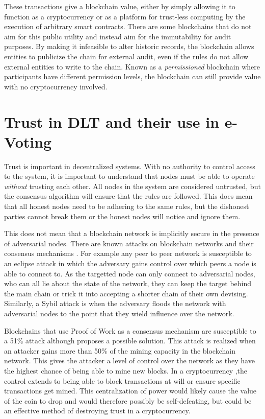 These transactions give a blockchain value, either by simply allowing it to function as a cryptocurrency or as a platform for trust-less computing by the execution of arbitrary smart contracts. There are some blockchains that do not aim for this public utility and instead aim for the immutability for audit purposes. By making it infeasible to alter historic records, the blockchain allows entities to publicize the chain for external audit, even if the rules do not allow external entities to write to the chain. Known as a \emph{permissioned} blockchain where participants have different permission levels, the blockchain can still provide value with no cryptocurrency involved.

\section{Trust in DLT and their use in e-Voting}
\label{ch:blockchain:trust}

Trust is important in decentralized systems. With no authority to control access to the system, it is important to understand that nodes must be able to operate \emph{without} trusting each other. All nodes in the system are considered untrusted, but the consensus algorithm will ensure that the rules are followed. This does mean that all honest nodes need to be adhering to the same rules, but the dishonest parties cannot break them or the honest nodes will notice and ignore them.

This does not mean that a blockchain network is implicitly secure in the presence of adversarial nodes. There are known attacks on blockchain networks and their consensus mechanisms \cite{wenAttacksCountermeasuresBlockchains2021a,eyalMajorityNotEnough2014,sapirshteinOptimalSelfishMining2017,karameDoublespendingFastPayments2012,apostolakiHijackingBitcoinRouting2017,gaziStakeBleedingAttacksProofofStake2018}. For example any peer to peer network is susceptible to an eclipse attack \cite{heilmanEclipseAttacksBitcoin2015} in which the adversary gains control over which peers a node is able to connect to. As the targetted node can only connect to adversarial nodes, who can all lie about the state of the network, they can keep the target behind the main chain or trick it into accepting a shorter chain of their own devising. Similarly, a Sybil attack \cite{douceurSybilAttack2002} is when the adversary floods the network with adversarial nodes to the point that they wield influence over the network.

Blockchains that use Proof of Work as a consensus mechanism are susceptible to a 51\% attack although \cite{yangEffectiveScheme512019} proposes a possible solution. This attack is realized when an attacker gains more than 50\% of the mining capacity in the blockchain network. This gives the attacker a level of control over the network as they have the highest chance of being able to mine new blocks. In a cryptocurrency ,the control extends to being able to block transactions at will or ensure specific transactions get mined. This centralization of power would likely cause the value of the coin to drop and would therefore possibly be self-defeating, but could be an effective method of destroying trust in a cryptocurrency.

